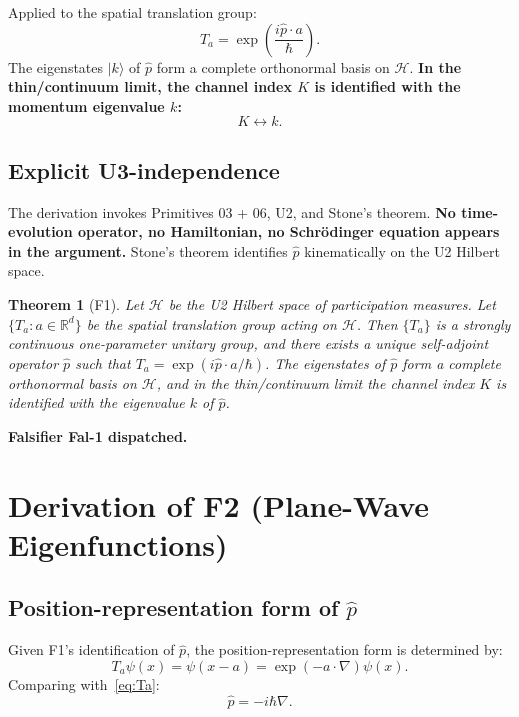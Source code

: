 \documentclass[11pt,a4paper]{article}
\newtheorem{theorem}{Theorem}[section]
\begin{document}
Applied to the spatial translation group:
\begin{equation}
T_a = \exp\!\left( \frac{i \hat{p} \cdot a}{\hbar} \right). \label{eq:Ta}
\end{equation}
The eigenstates $|k\rangle$ of $\hat{p}$ form a complete orthonormal basis on $\mathcal{H}$. \textbf{In the thin/continuum limit, the channel index $K$ is identified with the momentum eigenvalue $k$:}
\begin{equation}
K \leftrightarrow k. \label{eq:Kk}
\end{equation}

\subsection{Explicit U3-independence}

The derivation invokes Primitives 03 + 06, U2, and Stone's theorem. \textbf{No time-evolution operator, no Hamiltonian, no Schr\"odinger equation appears in the argument.} Stone's theorem identifies $\hat{p}$ kinematically on the U2 Hilbert space.

\begin{theorem}[F1]
Let $\mathcal{H}$ be the U2 Hilbert space of participation measures. Let $\{T_a : a \in \mathbb{R}^d\}$ be the spatial translation group acting on $\mathcal{H}$. Then $\{T_a\}$ is a strongly continuous one-parameter unitary group, and there exists a unique self-adjoint operator $\hat{p}$ such that $T_a = \exp(i \hat{p} \cdot a / \hbar)$. The eigenstates of $\hat{p}$ form a complete orthonormal basis on $\mathcal{H}$, and in the thin/continuum limit the channel index $K$ is identified with the eigenvalue $k$ of $\hat{p}$.
\end{theorem}

\textbf{Falsifier Fal-1 dispatched.}

\section{Derivation of F2 (Plane-Wave Eigenfunctions)}\label{sec:F2}

\subsection{Position-representation form of $\hat{p}$}

Given F1's identification of $\hat{p}$, the position-representation form is determined by:
\[
T_a \psi(x) = \psi(x - a) = \exp\!\left( -a \cdot \nabla \right) \psi(x).
\]
Comparing with~\eqref{eq:Ta}:
\begin{equation}
\hat{p} = -i \hbar \nabla. \label{eq:p-position}
\end{equation}
\end{document}
